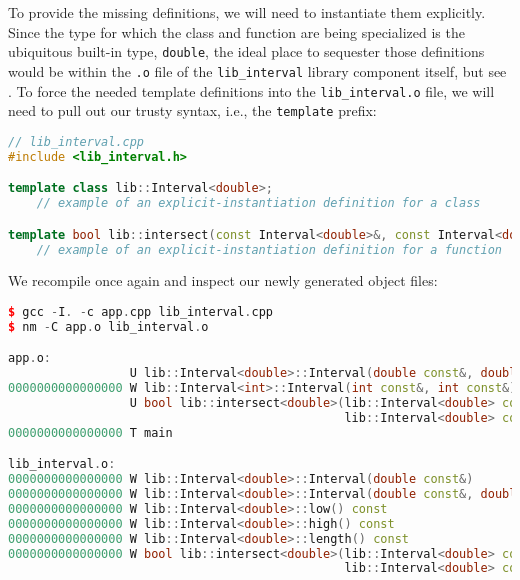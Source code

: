\noindent To provide the missing definitions, we will need to instantiate them
explicitly. Since the type for which the class and function are being
specialized is the ubiquitous built-in type, \lstinline!double!, the ideal
place to sequester those definitions would be within the \lstinline!.o!
file of the \lstinline!lib_interval! library component itself, but see . To force the needed
template definitions into the \lstinline!lib_interval.o! file, we will
need to pull out our trusty  syntax, i.e., the \lstinline!template! prefix:

\begin{lstlisting}[language=C++]
// lib_interval.cpp
#include <lib_interval.h>

template class lib::Interval<double>;
    // example of an explicit-instantiation definition for a class

template bool lib::intersect(const Interval<double>&, const Interval<double>&);
    // example of an explicit-instantiation definition for a function
\end{lstlisting}
    
\noindent We recompile once again and inspect our newly generated object files:

\begin{lstlisting}[language=C++]
$ gcc -I. -c app.cpp lib_interval.cpp
$ nm -C app.o lib_interval.o

app.o:
                 U lib::Interval<double>::Interval(double const&, double const&)
0000000000000000 W lib::Interval<int>::Interval(int const&, int const&)
                 U bool lib::intersect<double>(lib::Interval<double> const&,
                                               lib::Interval<double> const&)
0000000000000000 T main

lib_interval.o:
0000000000000000 W lib::Interval<double>::Interval(double const&)
0000000000000000 W lib::Interval<double>::Interval(double const&, double const&)
0000000000000000 W lib::Interval<double>::low() const
0000000000000000 W lib::Interval<double>::high() const
0000000000000000 W lib::Interval<double>::length() const
0000000000000000 W bool lib::intersect<double>(lib::Interval<double> const&,
                                               lib::Interval<double> const&)
\end{lstlisting}
    
